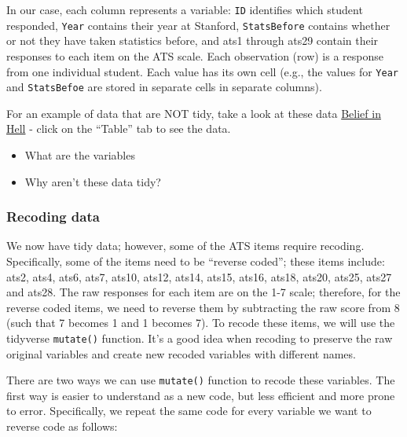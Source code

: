 \documentclass[12pt,]{book}
\providecommand{\tightlist}{%
  \setlength{\itemsep}{0pt}\setlength{\parskip}{0pt}}
\begin{document}
In our case, each column represents a variable: \texttt{ID} identifies which student responded, \texttt{Year} contains their year at Stanford, \texttt{StatsBefore} contains whether or not they have taken statistics before, and ats1 through ats29 contain their responses to each item on the ATS scale. Each observation (row) is a response from one individual student. Each value has its own cell (e.g., the values for \texttt{Year} and \texttt{StatsBefoe} are stored in separate cells in separate columns).

For an example of data that are NOT tidy, take a look at these data \href{http://www.pewforum.org/religious-landscape-study/belief-in-hell/\#generational-cohort}{Belief in Hell} - click on the ``Table'' tab to see the data.

\begin{itemize}
\tightlist
\item
  What are the variables
\item
  Why aren't these data tidy?
\end{itemize}

\hypertarget{recoding-data}{%
\subsubsection{Recoding data}\label{recoding-data}}

We now have tidy data; however, some of the ATS items require recoding. Specifically, some of the items need to be ``reverse coded''; these items include: ats2, ats4, ats6, ats7, ats10, ats12, ats14, ats15, ats16, ats18, ats20, ats25, ats27 and ats28. The raw responses for each item are on the 1-7 scale; therefore, for the reverse coded items, we need to reverse them by subtracting the raw score from 8 (such that 7 becomes 1 and 1 becomes 7). To recode these items, we will use the tidyverse \texttt{mutate()} function. It's a good idea when recoding to preserve the raw original variables and create new recoded variables with different names.

There are two ways we can use \texttt{mutate()} function to recode these variables. The first way is easier to understand as a new code, but less efficient and more prone to error. Specifically, we repeat the same code for every variable we want to reverse code as follows:
\end{document}
